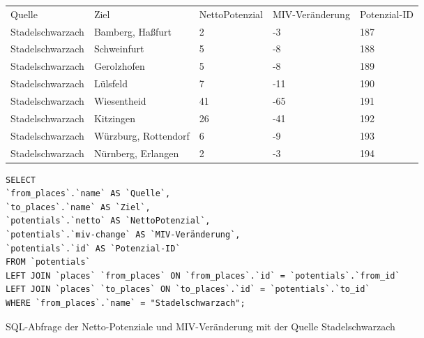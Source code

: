 \begin{tabularx}{\textwidth}{*5{X}}
Quelle & Ziel & NettoPotenzial & MIV-Veränderung & Potenzial-ID\\ 
Stadelschwarzach & Bamberg, Haßfurt & 2 & -3 & 187\\ 
Stadelschwarzach & Schweinfurt & 5 & -8 & 188\\ 
Stadelschwarzach & Gerolzhofen & 5 & -8 & 189\\ 
Stadelschwarzach & Lülsfeld & 7 & -11 & 190\\ 
Stadelschwarzach & Wiesentheid & 41 & -65 & 191\\ 
Stadelschwarzach & Kitzingen & 26 & -41 & 192\\ 
Stadelschwarzach & Würzburg, Rottendorf & 6 & -9 & 193\\ 
Stadelschwarzach & Nürnberg, Erlangen & 2 & -3 & 194\\ 
\end{tabularx}    
\newline
\newline
\begin{listing}[htbp]
\begin{verbatim}
SELECT
`from_places`.`name` AS `Quelle`, 
`to_places`.`name` AS `Ziel`, 
`potentials`.`netto` AS `NettoPotenzial`, 
`potentials`.`miv-change` AS `MIV-Veränderung`, 
`potentials`.`id` AS `Potenzial-ID`
FROM `potentials`
LEFT JOIN `places` `from_places` ON `from_places`.`id` = `potentials`.`from_id`
LEFT JOIN `places` `to_places` ON `to_places`.`id` = `potentials`.`to_id`
WHERE `from_places`.`name` = "Stadelschwarzach";
\end{verbatim}
\caption{SQL-Abfrage der Netto-Potenziale und MIV-Veränderung mit der Quelle Stadelschwarzach}\label{lst-fz-stadelschwarzach}
\end{listing}